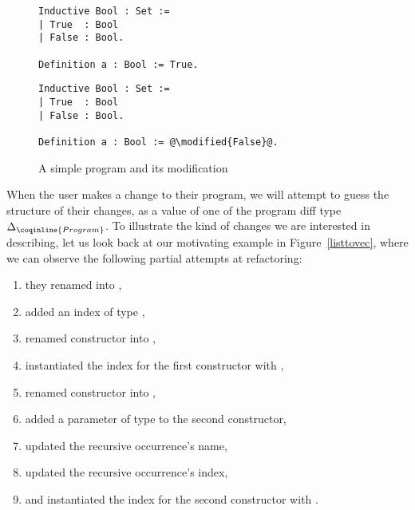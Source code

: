 \begin{figure*}[!htp]

  \noindent%
  \begin{minipage}[t]{0.50\textwidth}
    \begin{verbatim}
Inductive Bool : Set :=
| True  : Bool
| False : Bool.

Definition a : Bool := True.
\end{verbatim}
\end{minipage}%
\begin{minipage}[t]{0.50\textwidth}
  \begin{verbatim}
Inductive Bool : Set :=
| True  : Bool
| False : Bool.

Definition a : Bool := @\modified{False}@.
\end{verbatim}
\end{minipage}

\caption{A simple program and its modification}

\label{bool-modification}

\end{figure*}

When the user makes a change to their program, we will attempt to guess the
structure of their changes, as a value of one of the program diff type
$\Delta_{\coqinline{Program}}$.  To illustrate the kind of changes we are
interested in describing, let us look back at our motivating example in
Figure~\ref{listtovec}, where we can observe the following partial attempts at
refactoring:

\begin{enumerate}

\item they renamed  into ,

\item added an index of type ,

\item renamed constructor  into ,

\item instantiated the index for the first constructor with ,

\item renamed constructor  into ,

\item added a parameter  of type  to the second
  constructor,

\item updated the recursive occurrence's name,

\item updated the recursive occurrence's index,

\item and instantiated the index for the second constructor with .

\end{enumerate}

